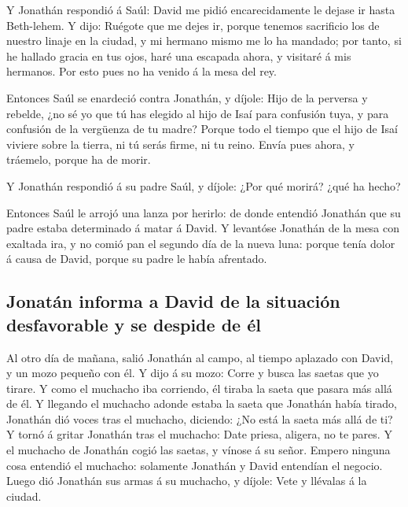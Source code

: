 Y Jonathán respondió á Saúl: David me pidió
encarecidamente le dejase ir hasta Beth-lehem.  Y dijo:
Ruégote que me dejes ir, porque tenemos sacrificio los de nuestro linaje
en la ciudad, y mi hermano mismo me lo ha mandado; por tanto, si he
hallado gracia en tus ojos, haré una escapada ahora, y visitaré á mis
hermanos. Por esto pues no ha venido á la mesa del rey.

 Entonces Saúl se enardeció contra Jonathán, y díjole:
Hijo de la perversa y rebelde, ¿no sé yo que tú has elegido al hijo de
Isaí para confusión tuya, y para confusión de la vergüenza de tu madre?
 Porque todo el tiempo que el hijo de Isaí viviere sobre
la tierra, ni tú serás firme, ni tu reino. Envía pues ahora, y tráemelo,
porque ha de morir.

 Y Jonathán respondió á su padre Saúl, y díjole: ¿Por qué
morirá? ¿qué ha hecho?

 Entonces Saúl le arrojó una lanza por herirlo: de donde
entendió Jonathán que su padre estaba determinado á matar á David.
 Y levantóse Jonathán de la mesa con exaltada ira, y no
comió pan el segundo día de la nueva luna: porque tenía dolor á causa de
David, porque su padre le había afrentado.

\hypertarget{jonatuxe1n-informa-a-david-de-la-situaciuxf3n-desfavorable-y-se-despide-de-uxe9l}{%
\subsection{Jonatán informa a David de la situación desfavorable y se
despide de
él}\label{jonatuxe1n-informa-a-david-de-la-situaciuxf3n-desfavorable-y-se-despide-de-uxe9l}}

 Al otro día de mañana, salió Jonathán al campo, al
tiempo aplazado con David, y un mozo pequeño con él.  Y
dijo á su mozo: Corre y busca las saetas que yo tirare. Y como el
muchacho iba corriendo, él tiraba la saeta que pasara más allá de él.
 Y llegando el muchacho adonde estaba la saeta que
Jonathán había tirado, Jonathán dió voces tras el muchacho, diciendo:
¿No está la saeta más allá de ti?  Y tornó á gritar
Jonathán tras el muchacho: Date priesa, aligera, no te pares. Y el
muchacho de Jonathán cogió las saetas, y vínose á su señor.
 Empero ninguna cosa entendió el muchacho: solamente
Jonathán y David entendían el negocio.  Luego dió
Jonathán sus armas á su muchacho, y díjole: Vete y llévalas á la ciudad.

